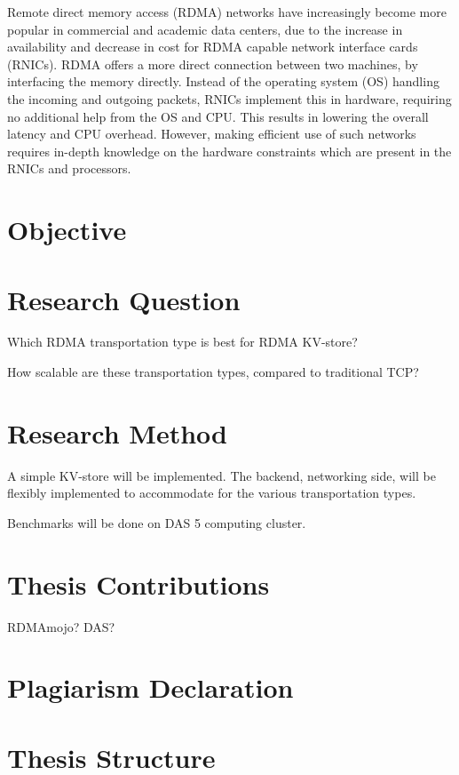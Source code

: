 Remote direct memory access (RDMA) networks have increasingly become more popular in commercial and academic data centers, due to the increase in availability and decrease in cost for RDMA capable network interface cards (RNICs).
RDMA offers a more direct connection between two machines, by interfacing the memory directly.
Instead of the operating system (OS) handling the incoming and outgoing packets, RNICs implement this in hardware, requiring no additional help from the OS and CPU. This results in lowering the overall latency and CPU overhead.
However, making efficient use of such networks requires in-depth knowledge on the hardware constraints which are present in the RNICs and processors\cite{chen2019scalable}.

\section{Objective}


\section{Research Question}
Which RDMA transportation type is best for RDMA KV-store?

How scalable are these transportation types, compared to traditional TCP?

\section{Research Method}
A simple KV-store will be implemented.
The backend, networking side, will be flexibly implemented to accommodate for the various transportation types.
 
Benchmarks will be done on DAS 5 computing cluster.

\section{Thesis Contributions}
RDMAmojo?
DAS?

\section{Plagiarism Declaration}

\section{Thesis Structure}